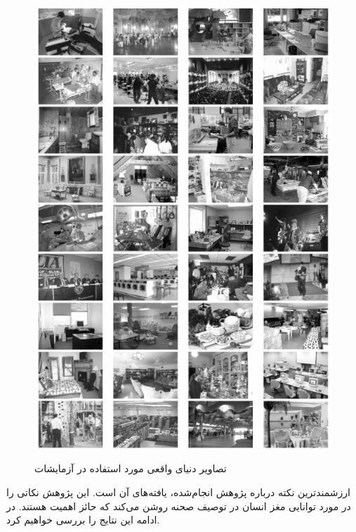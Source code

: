 \begin{figure}[H]
{		\includegraphics[scale=0.4]{./Imgs/fei2007we_data2.png}
	}
\caption{تصاویر دنیای واقعی مورد استفاده در آزمایشات\cite{fei2007we}}
\label{fig:f2007wd}
\end{figure}


ارزشمندترین نکته درباره پژوهش انجام‌شده، یافته‌های آن است. این پژوهش نکاتی را در مورد توانایی مغز انسان در توصیف صحنه روشن می‌کند که حائز اهمیت هستند. در ادامه این نتایج را بررسی خواهیم کرد.
